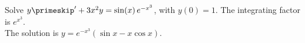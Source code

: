 {Solve $y\primeskip' + 3x^2y = \sin(x) \, e^{-x^3}$, with $y(0) = 1$.}
{The integrating factor is $e^{x^3}$.\\
The solution is $y=e^{-x^3}(\sin x-x\cos x)$.}